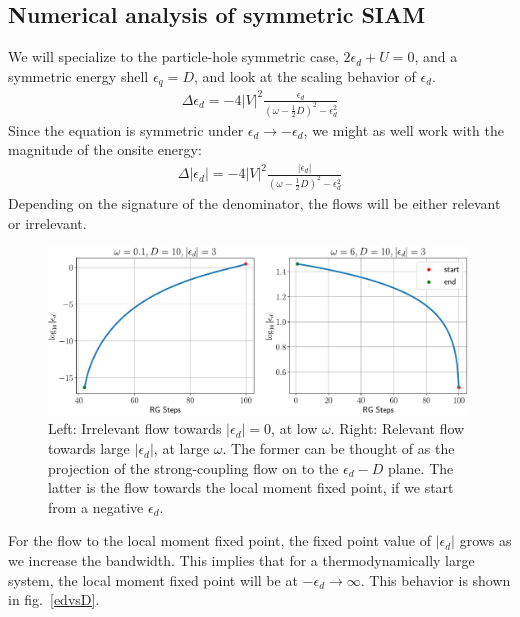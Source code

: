 \documentclass[twoside]{report}
\numberwithin{equation}{section}
\begin{document}
\subsection{Numerical analysis of symmetric SIAM}
We will specialize to the particle-hole symmetric case, \(2\epsilon_d + U = 0\), and a symmetric energy shell \(\epsilon_q = D\), and look at the scaling behavior of \(\epsilon_d\).
\begin{equation}\begin{aligned}
	\Delta \epsilon_d = -4|V|^2 \frac{\epsilon_d}{\left( \omega - \frac{1}{2}D \right)^2 - \epsilon_d^2}
\end{aligned}\end{equation}
Since the equation is symmetric under \(\epsilon_d \to -\epsilon_d\), we might as well work with the magnitude of the onsite energy:
\begin{equation}\begin{aligned}
	\Delta |\epsilon_d| = -4|V|^2 \frac{|\epsilon_d|}{\left( \omega - \frac{1}{2}D \right)^2 - \epsilon_d^2}
\end{aligned}\end{equation}
Depending on the signature of the denominator, the flows will be either relevant or irrelevant.
\begin{figure}[htpb]
	\centering
	\includegraphics[width=0.99\textwidth]{../figures/ed_pure_siam.pdf}
	\caption{Left: Irrelevant flow towards \(|\epsilon_d|=0\), at low \(\omega\). Right: Relevant flow towards large \(|\epsilon_d|\), at large \(\omega\). The former can be thought of as the projection of the strong-coupling flow on to the \(\epsilon_d-D\) plane. The latter is the flow towards the local moment fixed point, if we start from a negative \(\epsilon_d\).}
\end{figure}
For the flow to the local moment fixed point, the fixed point value of \(|\epsilon_d|\) grows as we increase the bandwidth. This implies that for a thermodynamically large system, the local moment fixed point will be at \(-\epsilon_d \to \infty\). This behavior is shown in fig.~\ref{edvsD}.
\end{document}
